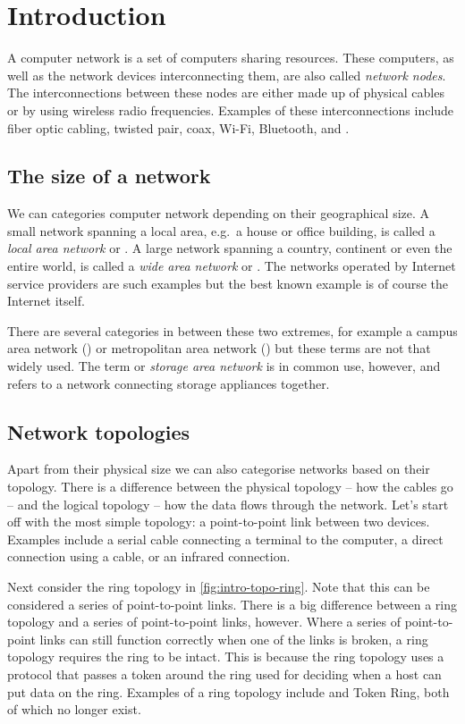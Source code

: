 \chapter{Introduction}

A computer network is a set of computers sharing resources.
These computers, as well as the network devices interconnecting them, are also called \emph{network nodes}.
The interconnections between these nodes are either made up of physical cables or by using wireless radio frequencies.
Examples of these interconnections include fiber optic cabling, twisted pair, coax, Wi-Fi, Bluetooth, and .



\section{The size of a network}

We can categories computer network depending on their geographical size.
A small network spanning a local area, e.g.~a house or office building, is called a \emph{local area network} or .
A large network spanning a country, continent or even the entire world, is called a \emph{wide area network} or .
The networks operated by Internet service providers are such examples but the best known example is of course the Internet itself.

There are several categories in between these two extremes, for example a campus area network () or metropolitan area network () but these terms are not that widely used.
The term  or \emph{storage area network} is in common use, however, and refers to a network connecting storage appliances together.



\section{Network topologies}

Apart from their physical size we can also categorise networks based on their topology.
There is a difference between the physical topology -- how the cables go -- and the logical topology -- how the data flows through the network.
Let's start off with the most simple topology: a point-to-point link between two devices.
Examples include a serial cable connecting a terminal to the computer, a direct connection using a  cable, or an infrared connection.

Next consider the ring topology in \vref{fig:intro-topo-ring}.
Note that this can be considered a series of point-to-point links.
There is a big difference between a ring topology and a series of point-to-point links, however.
Where a series of point-to-point links can still function correctly when one of the links is broken, a ring topology requires the ring to be intact.
This is because the ring topology uses a protocol that passes a token around the ring used for deciding when a host can put data on the ring.
Examples of a ring topology include  and Token Ring, both of which no longer exist.


